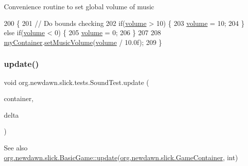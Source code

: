 Convenience routine to set global volume of music 
\begin{DoxyCode}
200                              \{
201         \textcolor{comment}{// Do bounds checking}
202         \textcolor{keywordflow}{if}(\mbox{\hyperlink{classorg_1_1newdawn_1_1slick_1_1tests_1_1_sound_test_a04840bd9a205022350bdba7878d5e373}{volume}} > 10) \{
203             \mbox{\hyperlink{classorg_1_1newdawn_1_1slick_1_1tests_1_1_sound_test_a04840bd9a205022350bdba7878d5e373}{volume}} = 10;
204         \} \textcolor{keywordflow}{else} \textcolor{keywordflow}{if}(\mbox{\hyperlink{classorg_1_1newdawn_1_1slick_1_1tests_1_1_sound_test_a04840bd9a205022350bdba7878d5e373}{volume}} < 0) \{
205             \mbox{\hyperlink{classorg_1_1newdawn_1_1slick_1_1tests_1_1_sound_test_a04840bd9a205022350bdba7878d5e373}{volume}} = 0;
206         \}
207         
208         \mbox{\hyperlink{classorg_1_1newdawn_1_1slick_1_1tests_1_1_sound_test_a468a454f66fe1fd34c65142e04714822}{myContainer}}.\mbox{\hyperlink{classorg_1_1newdawn_1_1slick_1_1_game_container_aec3a92df093fecdc3093b38c7b57b0bf}{setMusicVolume}}(\mbox{\hyperlink{classorg_1_1newdawn_1_1slick_1_1tests_1_1_sound_test_a04840bd9a205022350bdba7878d5e373}{volume}} / 10.0f);
209     \}
\end{DoxyCode}
\mbox{\label{classorg_1_1newdawn_1_1slick_1_1tests_1_1_sound_test_ac13bb1323d6ff26e218bfff39e1af1d1}} 
\subsubsection{\texorpdfstring{update()}{update()}}
{\footnotesize\ttfamily void org.\+newdawn.\+slick.\+tests.\+Sound\+Test.\+update (\begin{DoxyParamCaption}\item[{\mbox{\hyperlink{classorg_1_1newdawn_1_1slick_1_1_game_container}{Game\+Container}}}]{container,  }\item[{int}]{delta }\end{DoxyParamCaption})\hspace{0.3cm}{\ttfamily [inline]}}

\begin{DoxySeeAlso}{See also}
\mbox{\hyperlink{classorg_1_1newdawn_1_1slick_1_1_basic_game_acfe6fa05aef83bff1631af91a3e4bd20}{org.\+newdawn.\+slick.\+Basic\+Game\+::update}}(\mbox{\hyperlink{classorg_1_1newdawn_1_1slick_1_1_game_container}{org.\+newdawn.\+slick.\+Game\+Container}}, int) 
\end{DoxySeeAlso}


